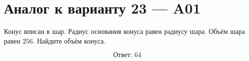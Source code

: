 \documentclass[12pt,a4paper]{article}
\begin{document}
\section*{Аналог к варианту 23 — A01}

Конус вписан в шар. Радиус основания конуса равен радиусу шара. Объём шара равен \(256\). Найдите объём конуса.

\begin{center}
\end{center}

\[
\boxed{\text{Ответ: }64}
\]
\end{document}
